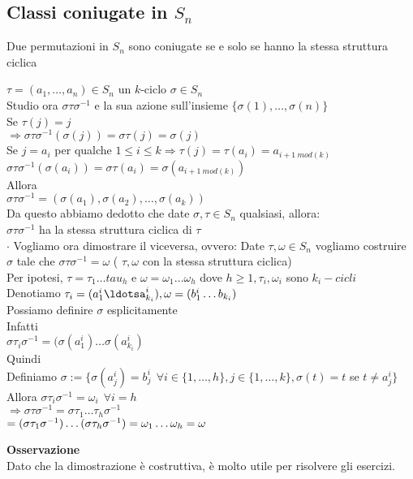 \documentclass[12px]{article}
\begin{document}
	\subsection{Classi coniugate in $S_n$}
	\begin{teo}[Fondamentale]
		Due permutazioni in $S_n$ sono coniugate se e solo se hanno la stessa struttura ciclica
	\end{teo}
	\begin{dimo}
	  	$\tau = (a_1,\ldots, a_n)\in S_n$ un $k$-ciclo $\sigma \in S_n$\\
		Studio ora  $\sigma \tau\sigma^{-1}$ e la sua azione sull'insieme  $\{\sigma(1),\ldots, \sigma(n)\}$\\
		Se  $\tau(j) = j$\\
		$ \Rightarrow \sigma \tau \sigma^{-1}(\sigma(j)) = \sigma\tau(j) = \sigma (j)$ \\
		Se $j = a_i$ per qualche $1\leq i\leq k \Rightarrow \tau (j) = \tau (a_i) = a_{i + 1 \ mod(k)}$ \\
		$\sigma\tau\sigma^{-1}(\sigma(a_i)) = \sigma\tau(a_i) = \sigma (a_{i + 1 \ mod(k)})$\\
		Allora \\
		$\sigma\tau\sigma^{-1} = (\sigma(a_1),\sigma(a_2),\ldots, \sigma(a_k))$\\
		 Da questo abbiamo dedotto che date $\sigma, \tau\in S_n$  qualsiasi, allora:\\
		 $\sigma\tau\sigma^{-1}$ ha la stessa struttura ciclica di $\tau$\\
		 $\cdot$ Vogliamo ora dimostrare il viceversa, ovvero: Date $\tau,\omega\in S_n$ vogliamo costruire  $\sigma$ tale che $\sigma\tau\sigma^{-1} = \omega$ ( $\tau,\omega$ con la stessa struttura ciclica)\\
		 Per ipotesi, $\tau = \tau_1\ldots tau_h$ e $\omega = \omega_1\ldots\omega_h$ dove $h\geq 1, \tau_i,\omega_i$ sono  $k_i-cicli$\\
		 Denotiamo  $\tau_i = (a_1^i\ldotsa^i_{k_i}), \omega = (b_1^i\ldots b_{k_i})$\\
		 Possiamo definire $\sigma$ esplicitamente\\
		 Infatti\\
		 $\sigma\tau_i\sigma^{-1} = (\sigma(a_1^i)\ldots\sigma(a_{k_i}^i)$\\
		 Quindi\\
		 Definiamo $\sigma := \{\sigma (a_j^i) = b_j^i \ \ \forall i\in\{1,\ldots, h\}, j\in \{1,\ldots,k\}, \sigma (t) = t $ se $t\neq a_j^i\}$\\
		 Allora $\sigma\tau_i\sigma^{-1} = \omega_i \ \ \forall i = h$\\
		 $ \Rightarrow \sigma\tau\sigma^{-1} = \sigma\tau_1\ldots\tau_h\sigma^{-1}$ \\
		 $= (\sigma\tau_1\sigma^{-1})\ldots(\sigma\tau_h\sigma^{-1})\\
		 =\omega_1\ldots\omega_h = \omega$
	\end{dimo}
	\textbf{Osservazione}\\
	Dato che la dimostrazione è costruttiva, è molto utile per risolvere gli esercizi.
\end{document}
